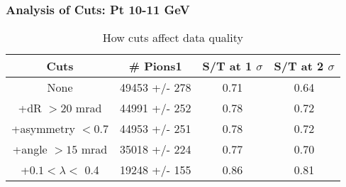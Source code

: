 \frame
{
\frametitle{Analysis of Cuts: Pt 10-11 GeV}
\begin{table}
\caption{How cuts affect data quality}
\centering
\begin{tabular}{c c c c}
\hline\hline
Cuts & \# Pions1 & S/T at 1 $\sigma$ & S/T at 2 $\sigma$ \\ [0.5ex]
\hline
None & 49453 +/-  278 & 0.71 & 0.64 \\ %
+dR $> 20$ mrad & 44991 +/-  252 & 0.78 & 0.72 \\ %
+asymmetry $< 0.7$ & 44953 +/-  251 & 0.78 & 0.72 \\ %
+angle $> 15$ mrad & 35018 +/-  224 & 0.77 & 0.70 \\ %
+$0.1 < \lambda <$ 0.4 & 19248 +/-  155 & 0.86 & 0.81 \\ %
[1ex]
\hline
\end{tabular}
\label{table:nonlin}
\end{table}
}

